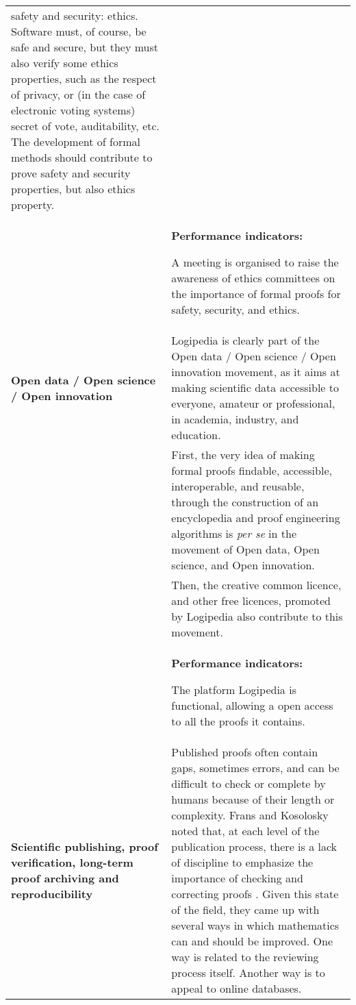 \begin{longtable}{|p{}|p{}|}
safety and security: ethics.  Software must, of course, be safe and
secure, but they must also verify some ethics properties, such as
the respect of privacy, or (in the case of electronic voting systems)
secret of vote, auditability, etc.
The development of formal methods should contribute to prove 
safety and security properties, but also ethics property.
\\
&
\colorbox{color2}{\bf Performance indicators:}
\begin{compactitem}
\item A meeting is organised to raise the awareness of ethics committees
  on the importance of formal proofs for safety, security, and ethics.
\end{compactitem}
\\
\hline
{\bf Open data / Open science / Open innovation}
&
Logipedia is clearly part of the Open data / Open science / Open
innovation movement, as it aims at making scientific data accessible
to everyone, amateur or professional, in academia, industry, and
education.\\
&
\hspace{0.4cm}
First, the very idea of making formal proofs findable, accessible,
interoperable, and reusable, through the construction of an
encyclopedia and proof engineering algorithms is {\em per se} in the
movement of Open data, Open science, and Open innovation.\\
&
\hspace{0.4cm}
Then, the creative common licence, and other free licences, promoted by 
Logipedia also contribute to this movement.\\
&
\colorbox{color2}{\bf Performance indicators:}
\begin{compactitem}
\item The platform Logipedia is functional, allowing a open access to all the proofs it contains.
\end{compactitem}
\\
\hline
{\bf Scientific publishing, proof verification, long-term proof archiving and reproducibility}
&
Published proofs often contain gaps, sometimes errors, and can be difficult
to check or complete by humans because of their length or
complexity. Frans and Kosolosky noted that, at each level of the
publication process, there is a lack of discipline to emphasize the
importance of checking and correcting proofs
\cite{frans14theoria}. Given this state of the field, they came up
with several ways in which mathematics can and should be improved.
One way is related to the reviewing process itself. Another
way is to appeal to online databases.


\end{longtable}
